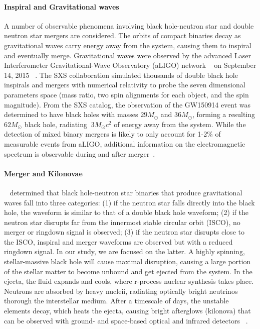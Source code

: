 \paragraph{Inspiral and Gravitational waves}
A number of observable phenomena involving black hole-neutron star and double neutron star mergers are considered.  
The orbits of compact binaries decay as gravitational waves carry energy away from the system, causing them to inspiral and eventually merge.  
Gravitational waves were observed by the advanced Laser Interferometer Gravitational-Wave Observatory (aLIGO) network ~\cite{aLIGO2} on September 14, 2015 ~\cite{LIGOVirgo2016a,Abbott:2016nmj}. 
The SXS collaboration simulated thousands of double black hole inspirals and mergers with numerical relativity to probe the seven dimensional parameters space (mass ratio, two spin alignments for each object, and the spin magnitude).  
From the SXS catalog, the observation of the GW150914 event was determined to have black holes with masses $29 M_\odot$ and $36 M_\odot$, forming a resulting $62 M_\odot$ black hole, radiating $~3 M_\odot c^2$ of energy away from the system.
While the detection of mixed binary mergers is likely to only account for 1-2\% of measurable events from aLIGO, additional information on the electromagnetic spectrum is observable during and after merger~\cite{1976ApJ...210..549L,Li:1998bw,Roberts2011,Kasen:2013xka,Tanaka:2013ana}. 

\paragraph{Merger and Kilonovae}
~\cite{Shibata:2009cn} determined that black hole-neutron star binaries that produce gravitational waves fall into three categories: 
(1) if the neutron star falls directly into the black hole, the waveform is similar to that of a double black hole waveform; 
(2) if the neutron star disrupts far from the innermost stable circular orbit (ISCO), no merger or ringdown signal is observed; 
(3) if the neutron star disrupts close to the ISCO, inspiral and merger waveforms are observed but with a reduced ringdown signal.
In our study, we are focused on the latter. 
A highly spinning, stellar-massive black hole will cause maximal disruption, causing a large portion of the stellar matter to become unbound and get ejected from the system.
In the ejecta, the fluid expands and cools, where r-process nuclear synthesis takes place.  
Neutrons are absorbed by heavy nucleii, radiating optically bright neutrinos thorough the interstellar medium. 
After a timescale of days, the unstable elements decay, which heats the ejecta, causing bright afterglows (kilonova) that can be observed with ground- and space-based optical and infrared detectors ~\cite{tanvir2013kilonova}.

